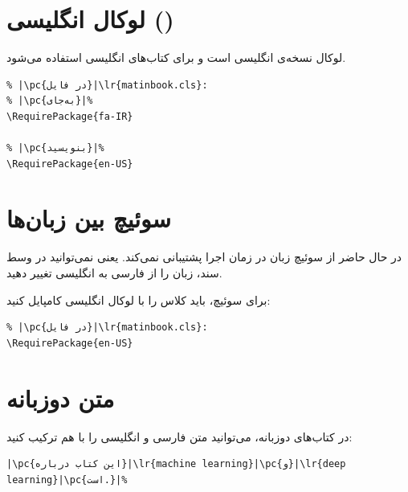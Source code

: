 
\section{لوکال انگلیسی ()}
\label{sec:localization-en}

لوکال  نسخه‌ی انگلیسی
 است و برای کتاب‌های انگلیسی
استفاده می‌شود.

\begin{latin}
\begin{verbatim}
% |\pc{در فایل}|\lr{matinbook.cls}:
% |\pc{به‌جای}|%
\RequirePackage{fa-IR}

% |\pc{بنویسید}|%
\RequirePackage{en-US}
\end{verbatim}
\end{latin}


\section{سوئیچ بین زبان‌ها}
\label{sec:localization-switching}

 در حال حاضر از سوئیچ زبان
در زمان اجرا پشتیبانی نمی‌کند. یعنی
نمی‌توانید در وسط سند، زبان را از فارسی به
انگلیسی تغییر دهید.

برای سوئیچ، باید کلاس را با لوکال انگلیسی
کامپایل کنید:

\begin{latin}
\begin{verbatim}
% |\pc{در فایل}|\lr{matinbook.cls}:
\RequirePackage{en-US}
\end{verbatim}
\end{latin}


\section{متن دوزبانه}
\label{sec:localization-bilingual}

در کتاب‌های دوزبانه، می‌توانید متن فارسی و
انگلیسی را با هم ترکیب کنید:

\begin{latin}
\begin{verbatim}
|\pc{این کتاب درباره}|\lr{machine learning}|\pc{و}|\lr{deep learning}|\pc{است.}|%
\end{verbatim}
\end{latin}


